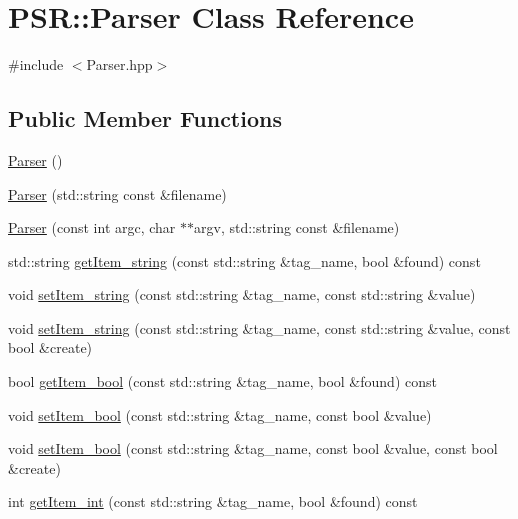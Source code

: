 \hypertarget{classPSR_1_1Parser}{\section{\-P\-S\-R\-:\-:\-Parser \-Class \-Reference}
\label{classPSR_1_1Parser}
}


{\ttfamily \#include $<$\-Parser.\-hpp$>$}

\subsection*{\-Public \-Member \-Functions}
\begin{DoxyCompactItemize}
\item 
\hyperlink{classPSR_1_1Parser_a34b990e35717ce451b1dd59a75653b6f}{\-Parser} ()
\item 
\hyperlink{classPSR_1_1Parser_ad288e0b3740193ac22145276dc0af2e3}{\-Parser} (std\-::string const \&filename)
\item 
\hyperlink{classPSR_1_1Parser_ac1dc5d7068237f6923a9221ba0e5e3a7}{\-Parser} (const int argc, char $\ast$$\ast$argv, std\-::string const \&filename)
\item 
std\-::string \hyperlink{classPSR_1_1Parser_ada8e6c2bd584f0e07334f3c934b15ce6}{get\-Item\-\_\-string} (const std\-::string \&tag\-\_\-name, bool \&found) const 
\item 
void \hyperlink{classPSR_1_1Parser_a3a40b9b3c9b939db80843db24189352e}{set\-Item\-\_\-string} (const std\-::string \&tag\-\_\-name, const std\-::string \&value)
\item 
void \hyperlink{classPSR_1_1Parser_a38e8aab89ed0e4a20550a39f0ec0a615}{set\-Item\-\_\-string} (const std\-::string \&tag\-\_\-name, const std\-::string \&value, const bool \&create)
\item 
bool \hyperlink{classPSR_1_1Parser_ab1114bd78f5978eadcdc17194478f1f5}{get\-Item\-\_\-bool} (const std\-::string \&tag\-\_\-name, bool \&found) const 
\item 
void \hyperlink{classPSR_1_1Parser_af9068c47ae599f134c704e1da98c1dd6}{set\-Item\-\_\-bool} (const std\-::string \&tag\-\_\-name, const bool \&value)
\item 
void \hyperlink{classPSR_1_1Parser_a5620970b7f074e07955f9d02795c57e2}{set\-Item\-\_\-bool} (const std\-::string \&tag\-\_\-name, const bool \&value, const bool \&create)
\item 
int \hyperlink{classPSR_1_1Parser_a489a6aa85d0cc63b6c3d53a200cdcf93}{get\-Item\-\_\-int} (const std\-::string \&tag\-\_\-name, bool \&found) const 
$$
\end{DoxyCompactItemize}
